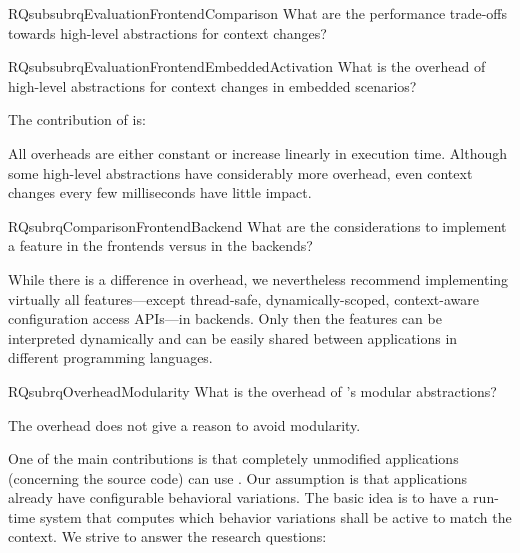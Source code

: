 \begin{restatable}{RQsubsub}{rqEvaluationFrontendComparison}
\label{rq:evaluation-frontend-comparison}
What are the performance trade-offs towards high-level abstractions for context changes?
\end{restatable}

\begin{restatable}{RQsubsub}{rqEvaluationFrontendEmbeddedActivation}
What is the overhead of high-level abstractions for context changes in embedded scenarios?%
\label{rq:evaluation-frontend-embedded-activation}
\end{restatable}

The contribution of  is:

\begin{contribution}
All overheads are either constant or increase linearly in execution time.
Although some high-level abstractions have considerably more overhead, even context changes every few milliseconds have little impact.
\end{contribution}

\begin{restatable}{RQsub}{rqComparisonFrontendBackend}
What are the considerations to implement a feature in the frontends versus in the backends?%
\label{rq:comparison-frontend-backend}
\end{restatable}

\begin{contribution}
While there is a difference in overhead, we nevertheless recommend implementing virtually all features---except thread-safe, dynamically-scoped, context-aware configuration access APIs---in backends.
Only then the features can be interpreted dynamically and can be easily shared between applications in different programming languages.
\end{contribution}

\begin{restatable}{RQsub}{rqOverheadModularity}
\label{rq:overhead-modularity}
What is the overhead of \elektra{}'s modular abstractions?
\end{restatable}

\begin{contribution}
The overhead does not give a reason to avoid modularity.
\end{contribution}

One of the main contributions is that completely unmodified applications (concerning the source code) can use \elektra{}.
Our assumption is that applications already have configurable behavioral variations.
The basic idea is to have a run-time system that computes which behavior variations shall be active to match the context.
We strive to answer the research questions:

